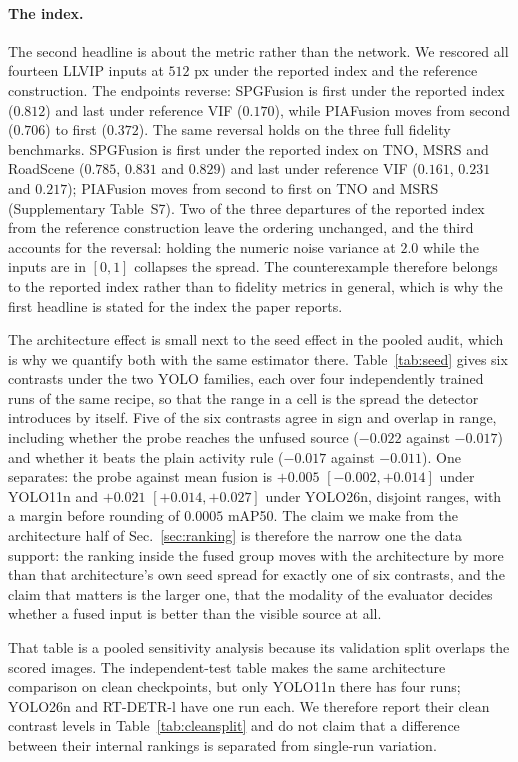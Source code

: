 \documentclass[preprint,10pt]{elsarticle}
\begin{document}
\begin{sloppypar}
\paragraph{The index.} The second headline is about the metric rather than the network.
We rescored all fourteen LLVIP inputs at $512$ px under the reported index and the
reference construction. The endpoints reverse: SPGFusion is first under the reported
index ($0.812$) and last under reference VIF ($0.170$), while PIAFusion moves from second
($0.706$) to first ($0.372$). The same reversal holds on the three full fidelity
benchmarks. SPGFusion is first under the reported index on TNO, MSRS and RoadScene
($0.785$, $0.831$ and $0.829$) and last under reference VIF
($0.161$, $0.231$ and $0.217$); PIAFusion moves from second to first on TNO and MSRS
(Supplementary Table~S7).
Two of the three departures of the reported index from the reference construction leave
the ordering unchanged, and the third accounts for the reversal: holding the numeric
noise variance at $2.0$ while the inputs are in $[0,1]$ collapses the spread. The
counterexample therefore belongs to the reported index rather than to fidelity metrics in
general, which is why the first headline is stated for the index the paper reports.

The architecture effect is small next to the seed effect in the pooled audit, which is
why we quantify both with the same estimator there. Table~\ref{tab:seed} gives six
contrasts under the two YOLO
families, each over four independently trained runs of the same recipe, so that the
range in a cell is the spread the detector introduces by itself. Five of the six
contrasts agree in sign and overlap in range, including whether the probe reaches the
unfused source ($-0.022$ against $-0.017$) and whether it beats the plain activity rule
($-0.017$ against $-0.011$). One separates: the probe against mean fusion is $+0.005$
$[-0.002,+0.014]$ under YOLO11n and $+0.021$ $[+0.014,+0.027]$ under YOLO26n, disjoint
ranges, with a margin before rounding of $0.0005$ mAP50. The claim we make from the
architecture half of Sec.~\ref{sec:ranking} is therefore the narrow one the data
support: the ranking inside the fused group moves with the architecture by more than
that architecture's own seed spread for exactly one of six contrasts, and the claim
that matters is the larger one, that the modality of the evaluator decides whether a
fused input is better than the visible source at all.

That table is a pooled sensitivity analysis because its validation split overlaps the
scored images. The independent-test table makes the same architecture comparison on
clean checkpoints, but only YOLO11n there has four runs; YOLO26n and RT-DETR-l have one
run each. We therefore report their clean contrast levels in
Table~\ref{tab:cleansplit} and do not claim that a difference between their internal
rankings is separated from single-run variation.


\end{sloppypar}
\end{document}
